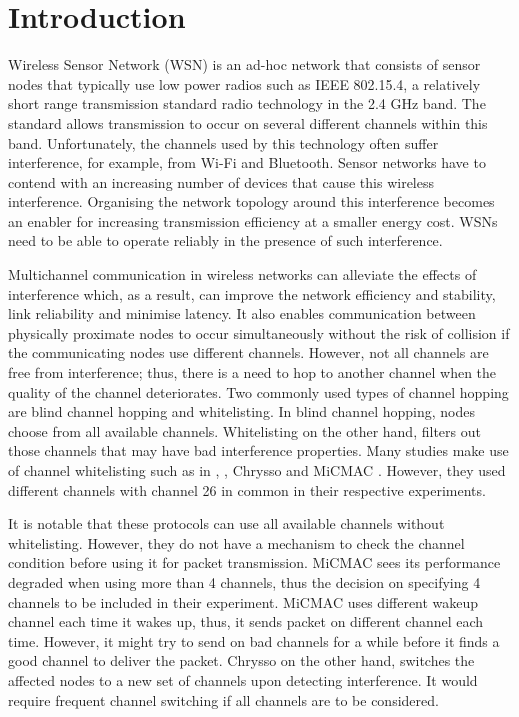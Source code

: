 \section{Introduction}
\label{sec:introduction}
Wireless Sensor Network (WSN) is an ad-hoc network that consists of sensor nodes that typically use low power radios such as IEEE 802.15.4, a relatively short range transmission standard radio technology in the 2.4 GHz band. The standard allows transmission to occur on several different channels within this band. Unfortunately, the channels used by this technology often suffer interference, for example, from Wi-Fi and Bluetooth. Sensor networks have to contend with an increasing number of devices that cause this wireless interference. Organising the network topology around this interference becomes an enabler for increasing transmission efficiency at a smaller energy cost. WSNs need to be able to operate reliably in the presence of such interference. 

Multichannel communication in wireless networks can alleviate the effects of interference which, as a result, can improve the network efficiency and stability, link reliability and minimise latency. It also enables communication between physically proximate nodes to occur simultaneously without the risk of collision if the communicating nodes use different channels. However, not all channels are free from interference; thus, there is a need to hop to another channel when the quality of the channel deteriorates. Two commonly used types of channel hopping \cite{watteyne} are blind channel hopping and whitelisting. In blind channel hopping, nodes choose from all available channels. Whitelisting on the other hand, filters out those channels that may have bad interference properties. Many studies make use of channel whitelisting such as in \cite{watteyne}, \cite{wu}, Chrysso \cite{chrysso} and MiCMAC \cite{micmac}. However, they used different channels with channel 26 in common in their respective experiments. 

It is notable that these protocols can use all available channels without whitelisting. However, they do not have a mechanism to check the channel condition before using it for packet transmission. MiCMAC sees its performance degraded when using more than 4 channels, thus the decision on specifying 4 channels to be included in their experiment. 
MiCMAC uses different wakeup channel each time it wakes up, thus, it sends packet on different channel each time. However, it might try to send on bad channels for a while before it finds a good channel to deliver the packet. Chrysso on the other hand, switches the affected nodes to a new set of channels upon detecting interference. It would require frequent channel switching if all channels are to be considered.

